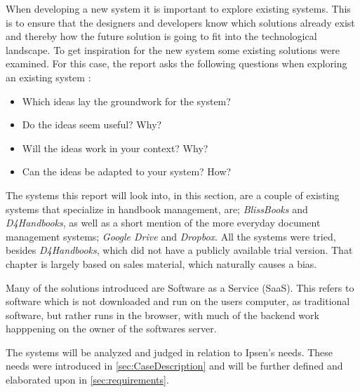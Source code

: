 When developing a new system it is important to explore existing systems.
This is to ensure that the designers and developers know which solutions already exist and thereby how the future solution is going to fit into the technological landscape.
To get inspiration for the new system some existing solutions were examined.
For this case, the report asks the following questions when exploring an existing system \citep[p.~33]{Rod-Aalborg}:

\begin{itemize}
  \item Which ideas lay the groundwork for the system?
  \item Do the ideas seem useful? Why?
  \item Will the ideas work in your context? Why?
  \item Can the ideas be adapted to your system? How?
\end{itemize}

The systems this report will look into, in this section, are a couple of existing systems that specialize in handbook management, are; \textit{BlissBooks} and \textit{D4Handbooks}, as well as a short mention of the more everyday document management systems; \textit{Google Drive} and \textit{Dropbox}.
All the systems were tried, besides \textit{D4Handbooks}, which did not have a publicly available trial version. That chapter is largely based on sales material, which naturally causes a bias.

Many of the solutions introduced are Software as a Service (SaaS).
This refers to software which is not downloaded and run on the users computer, as traditional software, but rather runs in the browser, with much of the backend work happpening on the owner of the softwares server. %

The systems will be analyzed and judged in relation to Ipsen's needs.
These needs were introduced in \ref{sec:CaseDescription} and will be further defined and elaborated upon in \ref{sec:requirements}.
